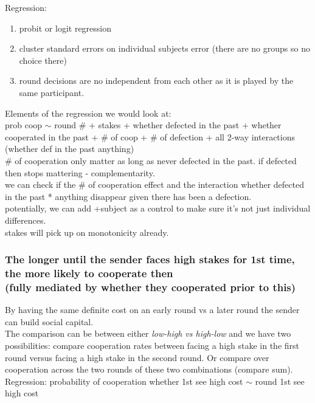 \documentclass[11pt]{article}
\theoremstyle{plainCl1}
\begin{document}
\noindent
Regression:
\begin{enumerate}
    \item probit or logit regression
    \item cluster standard errors on individual subjects error (there are no groups so no choice there)
    \item round decisions are no independent from each other as it is played by the same participant.
\end{enumerate}
Elements of the regression we would look at: \\
prob coop $\sim$ round \# + {\color{Green}stakes} + {\color{Green}whether defected in the past} + whether cooperated in the past + {\color{Green}\# of coop} + \# of defection + all 2-way interactions ({\color{Green}whether def in the past \* anything})\\
\# of cooperation only matter as long as never defected in the past. if defected then stops mattering - complementarity. \\
we can check if the \# of cooperation effect and the interaction whether defected in the past * anything disappear given there has been a defection. \\
potentially, we can add +subject as a control to make sure it's not just individual differences. \\
stakes will pick up on monotonicity already. \\


\subsubsection{The longer until the sender faces high stakes for 1st time, the more likely to cooperate then \\ 
(fully mediated by whether they cooperated prior to this)} 
By having the same definite cost on an early round vs a later round the sender can build social capital. \\

The comparison can be between either \textsl{low-high vs high-low} and we have two possibilities: compare cooperation rates between facing a high stake in the first round versus facing a high stake in the second round. Or compare over cooperation across the two rounds of these two combinations (compare sum). \\

\noindent
Regression:
probability of cooperation whether 1st see high cost $\sim$ round 1st see high cost
\end{document}
